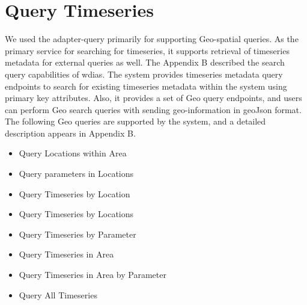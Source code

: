 \section{Query Timeseries}
\label{se:query}

We used the adapter-query primarily for supporting Geo-spatial queries. As the primary service for searching for timeseries, it supports retrieval of timeseries metadata for external queries as well. The Appendix B described the search query capabilities of \acrshort{wdias}.
The system provides timeseries metadata query endpoints to search for existing timeseries metadata within the system using primary key attributes.
Also, it provides a set of Geo query endpoints, and users can perform Geo search queries with sending geo-information in geoJson format. The following Geo queries are supported by the system, and a detailed description appears in Appendix B.
\begin{itemize}
    \item Query Locations within Area
    \item Query parameters in Locations
    \item Query Timeseries by Location
    \item Query Timeseries by Locations
    \item Query Timeseries by Parameter
    \item Query Timeseries in Area
    \item Query Timeseries in Area by Parameter
    \item Query All Timeseries
\end{itemize}
